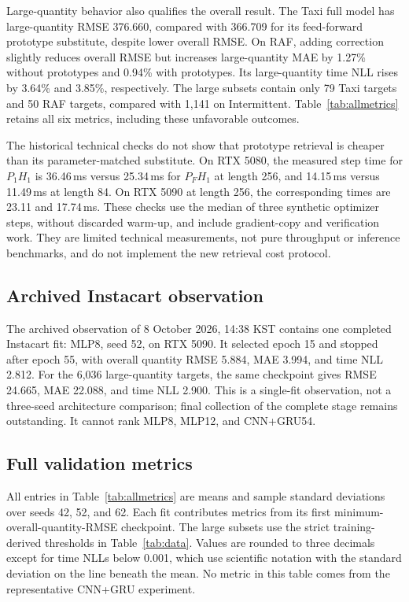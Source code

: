 \documentclass[runningheads]{llncs}
\begin{document}
Large-quantity behavior also qualifies the overall result. The Taxi full model has large-quantity RMSE 376.660, compared with 366.709 for its feed-forward prototype substitute, despite lower overall RMSE. On RAF, adding correction slightly reduces overall RMSE but increases large-quantity MAE by 1.27\% without prototypes and 0.94\% with prototypes. Its large-quantity time NLL rises by 3.64\% and 3.85\%, respectively. The large subsets contain only 79 Taxi targets and 50 RAF targets, compared with 1,141 on Intermittent. Table~\ref{tab:allmetrics} retains all six metrics, including these unfavorable outcomes.

The historical technical checks do not show that prototype retrieval is cheaper than its parameter-matched substitute. On RTX 5080, the measured step time for $P_1H_1$ is 36.46\,ms versus 25.34\,ms for $P_FH_1$ at length 256, and 14.15\,ms versus 11.49\,ms at length 84. On RTX 5090 at length 256, the corresponding times are 23.11 and 17.74\,ms. These checks use the median of three synthetic optimizer steps, without discarded warm-up, and include gradient-copy and verification work. They are limited technical measurements, not pure throughput or inference benchmarks, and do not implement the new retrieval cost protocol.

\subsection{Archived Instacart observation}
The archived observation of 8 October 2026, 14:38 KST contains one completed Instacart fit: MLP8, seed 52, on RTX 5090. It selected epoch 15 and stopped after epoch 55, with overall quantity RMSE 5.884, MAE 3.994, and time NLL 2.812. For the 6,036 large-quantity targets, the same checkpoint gives RMSE 24.665, MAE 22.088, and time NLL 2.900. This is a single-fit observation, not a three-seed architecture comparison; final collection of the complete stage remains outstanding. It cannot rank MLP8, MLP12, and CNN+GRU54.


\subsection{Full validation metrics}
All entries in Table~\ref{tab:allmetrics} are means and sample standard deviations over seeds 42, 52, and 62. Each fit contributes metrics from its first minimum-overall-quantity-RMSE checkpoint. The large subsets use the strict training-derived thresholds in Table~\ref{tab:data}. Values are rounded to three decimals except for time NLLs below 0.001, which use scientific notation with the standard deviation on the line beneath the mean. No metric in this table comes from the representative CNN+GRU experiment.
\end{document}
